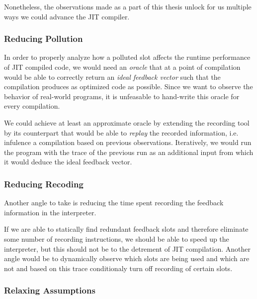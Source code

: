 Nonetheless, the observations made as a part of this thesis unlock for us multiple ways we could advance the JIT compiler.

\subsubsection*{Reducing Pollution}

In order to properly analyze how a polluted slot affects the runtime performance of JIT compiled code, we would need an \textit{oracle} that at a point of compilation would be able to correctly return an \textit{ideal feedback vector} such that the compilation produces as optimized code as possible. Since we want to observe the behavior of real-world programs, it is unfeasable to hand-write this oracle for every compilation.

We could achieve at least an approximate oracle by extending the recording tool by its counterpart that would be able to \textit{replay} the recorded information, i.e. infulence a compilation based on previous observations. Iteratively, we would run the program with the trace of the previous run as an additional input from which it would deduce the ideal feedback vector.

\subsubsection*{Reducing Recoding}

Another angle to take is reducing the time spent recording the feedback information in the interpreter.

If we are able to statically find redundant feedback slots and therefore eliminate some number of recording instructions, we should be able to speed up the interpreter, but this should not be to the detrement of JIT compilation. Another angle would be to dynamically observe which slots are being used and which are not and based on this trace conditionaly turn off recording of certain slots.

\subsubsection*{Relaxing Assumptions}

